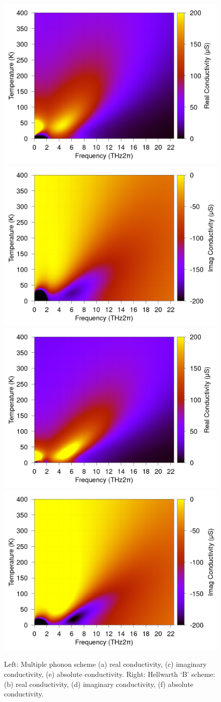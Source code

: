 \begin{figure}
    \centering
    \includegraphics[width=.49\textwidth]{figures/MAPI-single-real-conductivity-contourf.png}
    \includegraphics[width=.49\textwidth]{figures/MAPI-single-imag-conductivity-contourf.png}
    \includegraphics[width=.49\textwidth]{figures/MAPI-multi-real-conductivity-contourf.png}
    \includegraphics[width=.49\textwidth]{figures/MAPI-multi-imag-conductivity-contourf.png}
    \caption{Left: Multiple phonon scheme (a) real conductivity, (c) imaginary conductivity, (e) absolute conductivity. Right: Hellwarth `B' scheme: (b) real conductivity, (d) imaginary conductivity, (f) absolute conductivity.}
    \label{fig:multicontour}
\end{figure}

